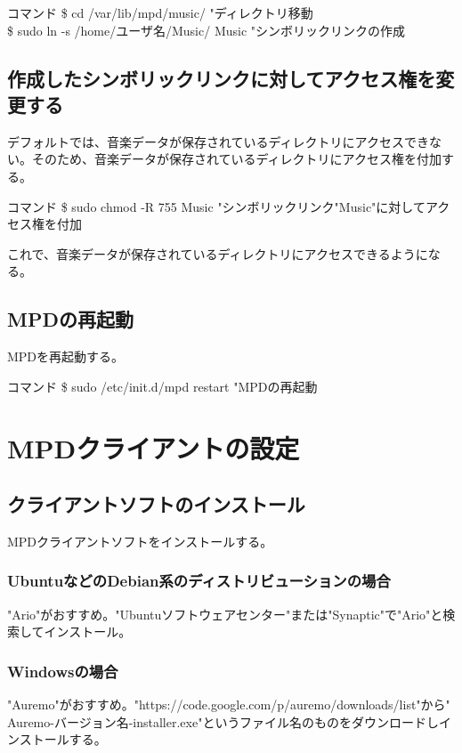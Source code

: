 \documentclass[11pt,a4paper]{jsarticle}
\begin{document}
\begin{itembox}[l]{コマンド}
\$ cd /var/lib/mpd/music/ "ディレクトリ移動\\
\$ sudo ln -s /home/ユーザ名/Music/ Music "シンボリックリンクの作成
\end{itembox}

\subsection{作成したシンボリックリンクに対してアクセス権を変更する}
デフォルトでは、音楽データが保存されているディレクトリにアクセスできない。そのため、音楽データが保存されているディレクトリにアクセス権を付加する。

\begin{itembox}[l]{コマンド}
\$ sudo chmod -R 755 Music "シンボリックリンク"Music"に対してアクセス権を付加
\end{itembox}

これで、音楽データが保存されているディレクトリにアクセスできるようになる。
\subsection{MPDの再起動}
MPDを再起動する。\\

\begin{itembox}[l]{コマンド}
\$ sudo /etc/init.d/mpd restart "MPDの再起動
\end{itembox}

\section{MPDクライアントの設定}
\subsection{クライアントソフトのインストール}
MPDクライアントソフトをインストールする。
\subsubsection{UbuntuなどのDebian系のディストリビューションの場合}
"Ario"がおすすめ。"Ubuntuソフトウェアセンター"または"Synaptic"で"Ario"と検索してインストール。
\subsubsection{Windowsの場合}
"Auremo"がおすすめ。"https://code.google.com/p/auremo/downloads/list"から"	Auremo-バージョン名-installer.exe"というファイル名のものをダウンロードしインストールする。
\end{document}
